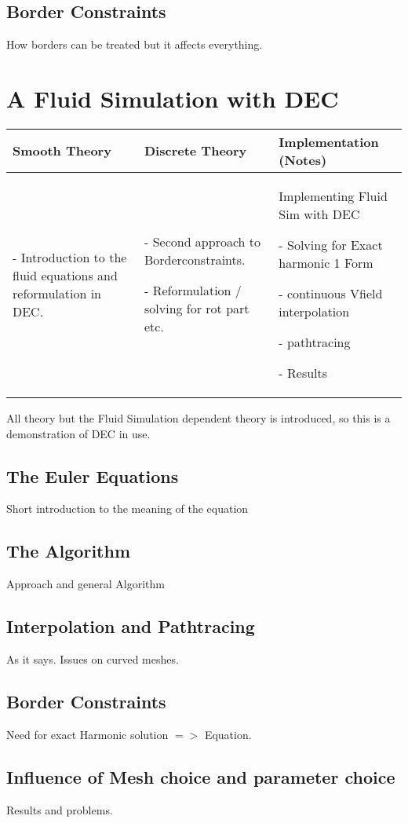 \documentclass[]{scrbook}
\newenvironment{packed_enum}{
\begin{enumerate}
  \setlength{\itemsep}{1pt}
  \setlength{\parskip}{0pt}
  \setlength{\parsep}{0pt}
}{\end{enumerate}}
\begin{document}
	\subsection{Border Constraints}
	How borders can be treated but it affects everything.
\newpage
\section{A Fluid Simulation with DEC}
	\begin{longtable}{|p{4.5cm}|p{4.5cm}|p{4.5cm}|}
		\hline
		Smooth Theory& Discrete Theory& Implementation (Notes)\\
		\hline
			\begin{packed_enum}
				\item[-] Introduction to the fluid equations and reformulation in DEC.
			\end{packed_enum}
			&
			\begin{packed_enum}
				\item[-] Second approach to Borderconstraints.
				\item[-] Reformulation / solving for rot part etc.
			\end{packed_enum}
			 & 
			 Implementing Fluid Sim with DEC
			 \begin{packed_enum}
				\item[-] Solving for Exact harmonic 1 Form
				\item[-] continuous Vfield interpolation
				\item[-] pathtracing
				\item[-] Results
			\end{packed_enum}
			 \\		
		\hline
	\end{longtable}
	All theory but the Fluid Simulation dependent theory is introduced, so this is a demonstration of DEC in use.
	\subsection{The Euler Equations}
	Short introduction to the meaning of the equation
	\subsection{The Algorithm}
	Approach and general Algorithm
	\subsection{Interpolation and Pathtracing}
	As it says. Issues on curved meshes.
	\subsection{Border Constraints}
	Need for exact Harmonic solution $=>$ Equation.
	\subsection{Influence of Mesh choice and parameter choice}
	Results and problems.
\end{document}
